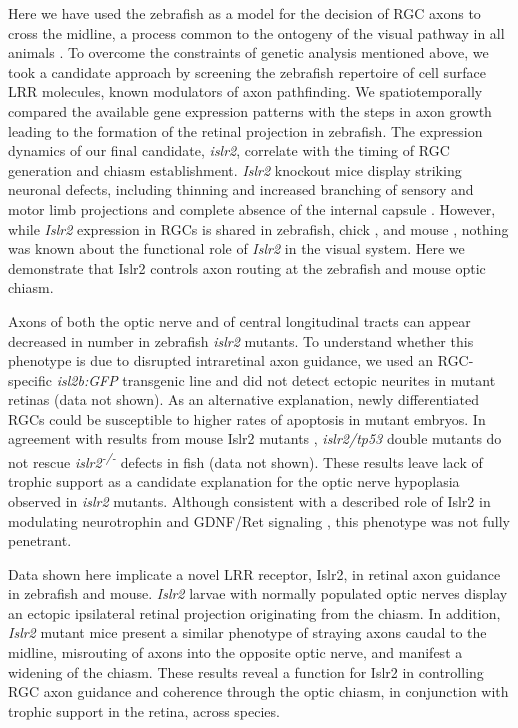 Here we have used the zebrafish as a model for the decision of RGC axons to cross the midline, a process common to the ontogeny of the visual pathway in all animals \cite{jeffery2005variations}.
To overcome the constraints of genetic analysis mentioned above, we took a candidate approach by screening the zebrafish repertoire of cell surface LRR molecules, known modulators of axon pathfinding.
We spatiotemporally compared the available gene expression patterns with the steps in axon growth leading to the formation of the retinal projection in zebrafish.
The expression dynamics of our final candidate, \emph{islr2}, correlate with the timing of RGC generation and chiasm establishment.
\emph{Islr2} knockout mice display striking neuronal defects, including thinning and increased branching of sensory and motor limb projections \cite{mandai2009lig} and complete absence of the internal capsule \cite{mandai2014linx}.
However, while \emph{Islr2} expression in RGCs is shared in zebrafish, chick \cite{gejima2006lrr}, and mouse \cite{blackshaw2004genomic}, nothing was known about the functional role of \emph{Islr2} in the visual system.
Here we demonstrate that Islr2 controls axon routing at the zebrafish and mouse optic chiasm.

Axons of both the optic nerve and of central longitudinal tracts can appear decreased in number in zebrafish \emph{islr2} mutants.
To understand whether this phenotype is due to disrupted intraretinal axon guidance, we used an RGC-specific \emph{isl2b:GFP} transgenic line \cite{pittman2008pathfinding} and did not detect ectopic neurites in mutant retinas (data not shown).
As an alternative explanation, newly differentiated RGCs could be susceptible to higher rates of apoptosis in mutant embryos.
In agreement with results from mouse Islr2 mutants \cite{mandai2009lig}, \emph{islr2/tp53} double mutants do not rescue \emph{islr2\textsuperscript{-/-}} defects in fish (data not shown).
These results leave lack of trophic support as a candidate explanation for the optic nerve hypoplasia observed in \emph{islr2} mutants.
Although consistent with a described role of Islr2 in modulating neurotrophin and GDNF/Ret signaling \cite{mandai2009lig}, this phenotype was not fully penetrant.

Data shown here implicate a novel LRR receptor, Islr2, in retinal axon guidance in zebrafish and mouse.
\emph{Islr2} larvae with normally populated optic nerves display an ectopic ipsilateral retinal projection originating from the chiasm.
In addition, \emph{Islr2} mutant mice present a similar phenotype of straying axons caudal to the midline, misrouting of axons into the opposite optic nerve, and manifest a widening of the chiasm.
These results reveal a function for Islr2 in controlling RGC axon guidance and coherence through the optic chiasm, in conjunction with trophic support in the retina, across species.

